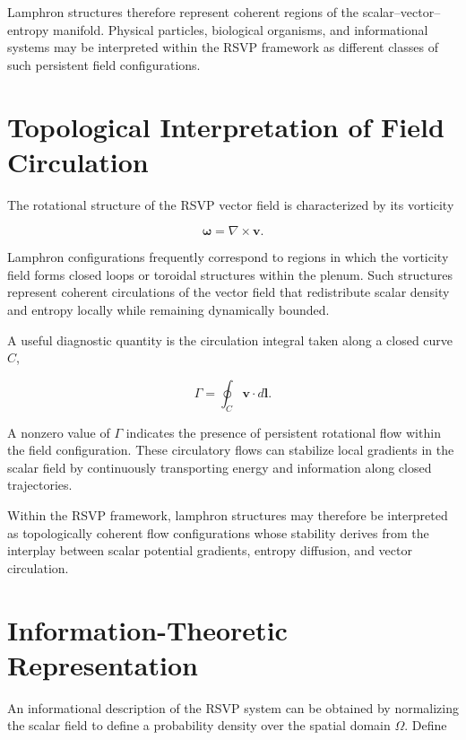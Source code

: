 \documentclass[12pt]{article}
\begin{document}
Lamphron structures therefore represent coherent regions of the scalar–vector–entropy manifold. Physical particles, biological organisms, and informational systems may be interpreted within the RSVP framework as different classes of such persistent field configurations.

\section{Topological Interpretation of Field Circulation}
\label{sec:circulation}

The rotational structure of the RSVP vector field is characterized by its vorticity

\begin{equation}
\boldsymbol{\omega} = \nabla \times \mathbf{v}.
\end{equation}

Lamphron configurations frequently correspond to regions in which the vorticity field forms closed loops or toroidal structures within the plenum. Such structures represent coherent circulations of the vector field that redistribute scalar density and entropy locally while remaining dynamically bounded.

A useful diagnostic quantity is the circulation integral taken along a closed curve $C$,

\begin{equation}
\Gamma = \oint_C \mathbf{v} \cdot d\mathbf{l}.
\end{equation}

A nonzero value of $\Gamma$ indicates the presence of persistent rotational flow within the field configuration. These circulatory flows can stabilize local gradients in the scalar field by continuously transporting energy and information along closed trajectories.

Within the RSVP framework, lamphron structures may therefore be interpreted as topologically coherent flow configurations whose stability derives from the interplay between scalar potential gradients, entropy diffusion, and vector circulation.

\section{Information-Theoretic Representation}
\label{sec:information_entropy}

An informational description of the RSVP system can be obtained by normalizing the scalar field to define a probability density over the spatial domain $\Omega$. Define
\end{document}

